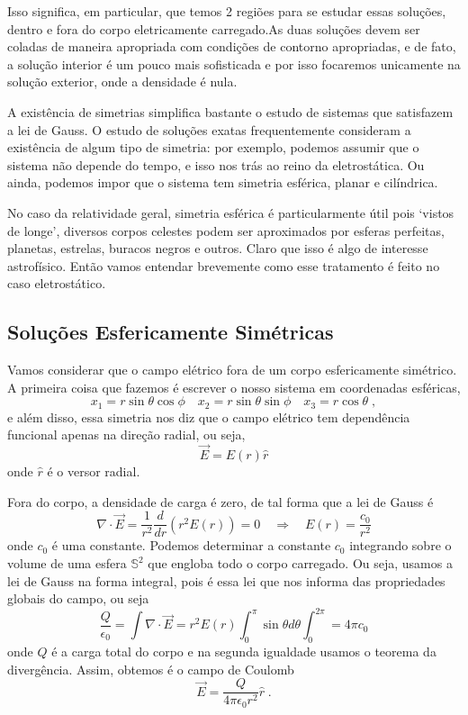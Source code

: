 \documentclass[11pt]{article}
\begin{document}
Isso significa, em particular, que temos 2 regiões para se estudar essas
soluções, dentro e fora do corpo eletricamente carregado.As duas
soluções devem ser coladas de maneira apropriada com condições de
contorno apropriadas, e de fato, a solução interior é um pouco mais
sofisticada e por isso focaremos unicamente na solução exterior, onde a
densidade é nula.

A existência de simetrias simplifica bastante o estudo de sistemas que
satisfazem a lei de Gauss. O estudo de soluções exatas frequentemente
consideram a existência de algum tipo de simetria: por exemplo, podemos
assumir que o sistema não depende do tempo, e isso nos trás ao reino da
eletrostática. Ou ainda, podemos impor que o sistema tem simetria
esférica, planar e cilíndrica.

No caso da relatividade geral, simetria esférica é particularmente útil
pois `vistos de longe', diversos corpos celestes podem ser aproximados
por esferas perfeitas, planetas, estrelas, buracos negros e outros.
Claro que isso é algo de interesse astrofísico. Então vamos entendar
brevemente como esse tratamento é feito no caso eletrostático.

    \hypertarget{soluuxe7uxf5es-esfericamente-simuxe9tricas}{%
\subsection{Soluções Esfericamente
Simétricas}\label{soluuxe7uxf5es-esfericamente-simuxe9tricas}}

    Vamos considerar que o campo elétrico fora de um corpo esfericamente
simétrico. A primeira coisa que fazemos é escrever o nosso sistema em
coordenadas esféricas,
\[\tag{2.3} x_1 = r \sin\theta \cos\phi\quad x_2 = r \sin\theta \sin\phi\quad  x_3 = r \cos\theta\; ,\]
e além disso, essa simetria nos diz que o campo elétrico tem dependência
funcional apenas na direção radial, ou seja,
\[ \tag{2.4} \vec{E} = E(r) \hat{r}\] onde \(\hat{r}\) é o versor
radial.

Fora do corpo, a densidade de carga é zero, de tal forma que a lei de
Gauss é
\[ \tag{2.5} \nabla\cdot \vec{E} = \frac{1}{r^2}\frac{d}{dr}(r^2 E(r)) = 0 \quad \Rightarrow \quad E(r) = \frac{c_0}{r^2} \]
onde \(c_0\) é uma constante. Podemos determinar a constante \(c_0\)
integrando sobre o volume de uma esfera \(\mathbb{S}^2\) que engloba
todo o corpo carregado. Ou seja, usamos a lei de Gauss na forma
integral, pois é essa lei que nos informa das propriedades globais do
campo, ou seja
\[ \tag{2.6} \frac{Q}{\epsilon_0}= \int \nabla\cdot \vec{E} =  r^2 E(r) \int_{0}^\pi \sin\theta d\theta \int_{0}^{2\pi} = 4 \pi c_0  \]
onde \(Q\) é a carga total do corpo e na segunda igualdade usamos o
teorema da divergência. Assim, obtemos é o campo de Coulomb
\[ \tag{2.7} \vec{E} = \frac{Q}{4 \pi \epsilon_0 r^2} \hat{r} \; . \]
\end{document}

